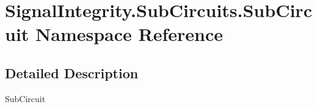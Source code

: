 \hypertarget{namespaceSignalIntegrity_1_1SubCircuits_1_1SubCircuit}{}\section{Signal\+Integrity.\+Sub\+Circuits.\+Sub\+Circuit Namespace Reference}
\label{namespaceSignalIntegrity_1_1SubCircuits_1_1SubCircuit}


\subsection{Detailed Description}
\begin{DoxyVerb}SubCircuit\end{DoxyVerb}
 